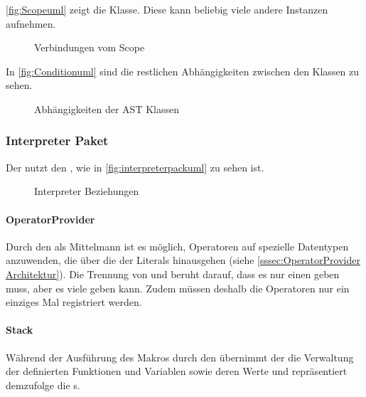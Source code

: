       \autoref{fig:Scopeuml} zeigt die  Klasse. Diese kann beliebig viele andere  Instanzen aufnehmen.
      \begin{figure}[H]
        \centering
        \caption{Verbindungen vom Scope}
        \label{fig:Scopeuml}
      \end{figure}

      In \autoref{fig:Conditionuml} sind die restlichen Abhängigkeiten zwischen den  Klassen zu sehen.
      \begin{figure}[H]
        \centering
        \caption{Abhängigkeiten der AST Klassen}
        \label{fig:Conditionuml}
      \end{figure}

    \subsubsection{Interpreter Paket}
    \label{sssec:Interpreter Paket}
      Der  nutzt den , wie in \autoref{fig:interpreterpackuml} zu sehen ist.

      \begin{figure}[H]
        \centering
        \caption{Interpreter Beziehungen}
        \label{fig:interpreterpackuml}
      \end{figure}

      \paragraph{OperatorProvider}
        Durch den  als Mittelmann ist es möglich, Operatoren auf spezielle Datentypen anzuwenden, die über die der Literals hinausgehen (siehe \autoref{sssec:OperatorProvider Architektur}). Die Trennung von  und  beruht darauf, dass es nur einen  geben muss, aber es viele  geben kann. Zudem müssen deshalb die Operatoren nur ein einziges Mal registriert werden.

      \paragraph{Stack}
        Während der Ausführung des Makros durch den  übernimmt der  die Verwaltung der definierten Funktionen und Variablen sowie deren Werte und repräsentiert demzufolge die s.

